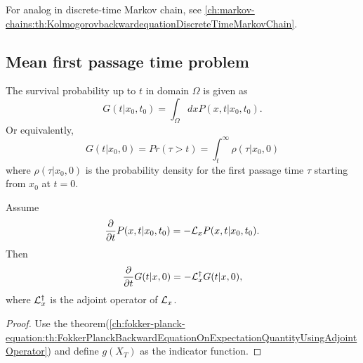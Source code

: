 \begin{refsection}
\begin{remark}
For analog in discrete-time Markov chain, see \autoref{ch:markov-chains:th:KolmogorovbackwardequationDiscreteTimeMarkovChain}.
\end{remark}


\subsection{Mean first passage time problem}

\begin{definition}
	The survival probability up to $t$ in domain $\Omega$ is given as
	$$G(t|x_0,t_0) = \int_{\Omega} dx P(x,t|x_0,t_0).$$
	Or equivalently, 
	$$G(t|x_0,0) = Pr(\tau > t) = \int_t^{\infty} \rho(\tau|x_0,0)$$
	where $\rho(\tau|x_0,0)$ is the probability density for the first passage time $\tau$ starting from $x_0$ at $t = 0$.
\end{definition}

\begin{lemma}
Assume
$$\frac{\partial }{\partial t} P(x,t|x_0,t_0) = -\mathcal{L}_x P(x,t|x_0,t_0).$$
Then
	$$\frac{\partial }{\partial t}G(t|x,0) = -\mathcal{L}_{x}^{\dagger}G(t|x,0),$$
where $\mathcal{L}_x^\dagger$ is the adjoint operator of $\mathcal{L}_x$.
\end{lemma}
\begin{proof}
Use the theorem(\autoref{ch:fokker-planck-equation:th:FokkerPlanckBackwardEquationOnExpectationQuantityUsingAdjointOperator}) and define $g(X_T)$ as the indicator function. 
\end{proof}


\end{refsection}
